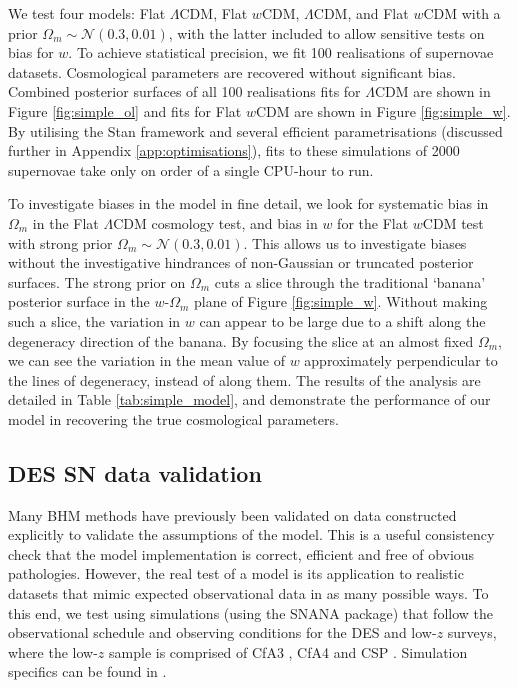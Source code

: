 \documentclass[a4paper,fleqn,usenatbib]{mnras}
\newcommand{\green}{\color{forestgreen}}
\begin{document}
We test four models: Flat $\Lambda$CDM, Flat $w$CDM, $\Lambda$CDM, and Flat $w$CDM with a prior $\Omega_m \sim \mathcal{N}(0.3, 0.01)$, with the latter included to allow sensitive tests on bias for $w$. To achieve statistical precision, we fit 100 realisations of supernovae datasets. Cosmological parameters are recovered without significant bias. Combined posterior surfaces of all 100 realisations fits for $\Lambda$CDM are shown in Figure \ref{fig:simple_ol} and fits for Flat $w$CDM are shown in Figure \ref{fig:simple_w}. By utilising the Stan framework and several efficient parametrisations (discussed further in Appendix \ref{app:optimisations}), fits to these simulations of 2000 supernovae take only on order of a single CPU-hour to run.

To investigate biases in the model in fine detail, we look for systematic bias in $\Omega_m$ in the Flat $\Lambda$CDM cosmology test, and bias in $w$ for the Flat $w$CDM test with strong prior $\Omega_m \sim \mathcal{N}(0.3, 0.01)$. This allows us to investigate biases without the investigative hindrances of non-Gaussian or truncated posterior surfaces. The strong prior on $\Omega_m$ cuts a slice through the traditional `banana' posterior surface in the $w$-$\Omega_m$ plane of Figure \ref{fig:simple_w}. Without making such a slice, the variation in $w$ can appear to be large due to a shift along the degeneracy direction of the banana. By focusing the slice at an almost fixed $\Omega_m$, we can see the variation in the mean value of $w$ approximately perpendicular to the lines of degeneracy, instead of along them. The results of the analysis are detailed in Table \ref{tab:simple_model}, and demonstrate the performance of our model in recovering the true cosmological parameters.




















\subsection{DES SN data validation}
\label{sec:simdes}

{\green Many BHM methods have previously been validated on data constructed explicitly to validate the assumptions of the model. This is a useful consistency check that the model implementation is correct, efficient and free of obvious pathologies. However, the real test of a model is its application to realistic datasets that mimic expected observational data in as many possible ways. To this end, we test using simulations} (using the SNANA package) that follow the observational schedule and observing conditions for the DES and low-$z$ surveys, where the low-$z$ sample is comprised of CfA3 \citep{Hicken2009, Hicken2009a}, CfA4 \citep{Hicken2012} and CSP \citep{Contreras2010,Folatelli2010,Stritzinger2011}. Simulation specifics can be found in \citet{Kessler18}.
\end{document}
